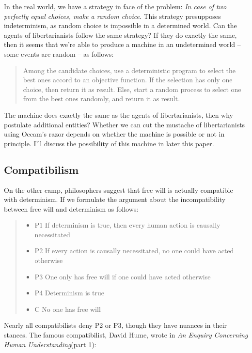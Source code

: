 In the real world, we have a strategy in face of the problem: \emph{In case of two perfectly equal choices, make a random choice}. This strategy presupposes indeterminism, as random choice is impossible in a determined world. Can the agents of libertarianists follow the same strategy? If they do exactly the same, then it seems that we're able to produce a machine in an undetermined world  -- some events are random -- as follows:

\begin{quote}
Among the candidate choices, use a deterministic program to select the best ones accord to an objective function. If the selection has only one choice, then return it as result. Else, start a random process to select one from the best ones randomly, and return it as result.
\end{quote}

The machine does exactly the same as the agents of libertarianists, then why postulate additional entities? Whether we can cut the mustache of libertarianists using Occam's razor depends on whether the machine is possible or not in principle. I'll discuss the possibility of this machine in later this paper.
\fi

\subsection{Compatibilism}

On the other camp, philosophers suggest that free will is actually compatible with determinism. If we formulate the argument about the incompatibility between free will and determinism as follows:

\begin{quote}
  \begin{itemize}
    \item P1 If determinism is true, then every human action is causally necessitated
    \item P2 If every action is causally necessitated, no one could have acted otherwise
    \item P3 One only has free will if one could have acted otherwise
    \item P4 Determinism is true
    \item C No one has free will
  \end{itemize}
\end{quote}

Nearly all compatibilists deny P2 or P3, though they have nuances in their stances. The famous compatibilist, David Hume, wrote in \emph{An Enquiry Concerning Human Understanding}(part 1):

